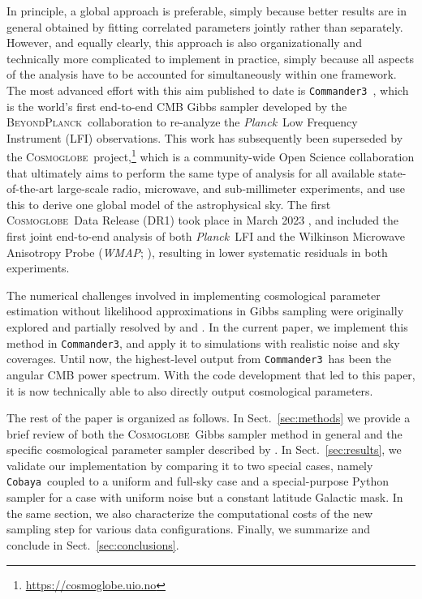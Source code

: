 \documentclass[twocolumn]{../common/aa}
\def\WMAP{\emph{WMAP}}
\def\Planck{\emph{Planck}}
\def\commanderthree{\texttt{Commander3}}
\def\cobaya{\texttt{Cobaya}}
\newcommand{\BP}{\textsc{BeyondPlanck}}
\newcommand{\cosmoglobe}{\textsc{Cosmoglobe}}
\begin{document}
In principle, a global approach is preferable, simply because better results are in general obtained by fitting correlated parameters jointly rather than separately. However, and equally clearly, this approach is also organizationally and technically more complicated to implement in practice, simply because all aspects of the analysis have to be accounted for simultaneously within one framework. The most advanced effort with this aim published to date is \commanderthree\ \citep{bp03}, which is the world's first end-to-end CMB Gibbs sampler developed by the \BP\ collaboration to re-analyze the \Planck\ Low Frequency Instrument (LFI) observations. This work has subsequently been superseded by the \cosmoglobe\ project,\footnote{\url{https://cosmoglobe.uio.no}} which is a community-wide Open Science collaboration that ultimately aims to perform the same type of analysis for all available state-of-the-art large-scale radio, microwave, and sub-millimeter experiments, and use this to derive one global model of the astrophysical sky. The first \cosmoglobe\ Data Release (DR1) took place in March 2023 \citep{watts2023_dr1}, and included the first joint end-to-end analysis of both \Planck\ LFI and the Wilkinson Microwave Anisotropy Probe (\WMAP; \citealp{bennett2012}), resulting in lower systematic residuals in both experiments.

The numerical challenges involved in implementing cosmological parameter estimation without likelihood approximations in Gibbs sampling were originally explored and partially resolved by \citet{jewell:2009} and \citet{racine:2016}. In the current paper, we implement this method in \commanderthree, and apply it to simulations with realistic noise and sky coverages. Until now, the highest-level output from \commanderthree\ has been the angular CMB power spectrum. With the code development that led to this paper, it is now technically able to also directly output cosmological parameters.

The rest of the paper is organized as follows. In Sect.~\ref{sec:methods} we provide a brief review of both the \cosmoglobe\ Gibbs sampler method in general and the specific cosmological parameter sampler described by \citet{racine:2016}. In Sect.~\ref{sec:results}, we validate our implementation by comparing it to two special cases, namely \cobaya\ coupled to a uniform and full-sky case and a special-purpose Python sampler for a case with uniform noise but a constant latitude Galactic mask. In the same section, we also characterize the computational costs of the new sampling step for various data configurations. Finally, we summarize and conclude in Sect.~\ref{sec:conclusions}.
\end{document}
